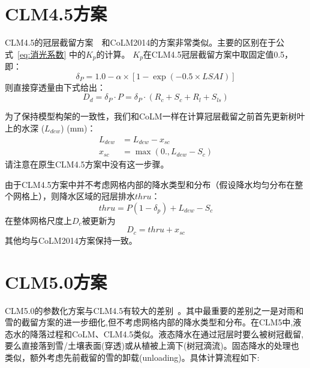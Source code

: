 \section{CLM4.5方案}
CLM4.5的冠层截留方案~\citep{oleson2013technical}~和CoLM2014的方案非常类似。主要的区别在于公式~\eqref{eq:消光系数} 中的$K_p$的计算。
$K_p$在CLM4.5冠层截留方案中取固定值0.5，即：
%
\begin{equation}
\delta_{P}=1.0-\alpha \times\left[1-\exp \left(-0.5 \times LSAI\right)\right]
\end{equation}
则直接穿透量由下式给出：
\begin{equation}
D_{d}=\delta_{P} \cdot P=\delta_{P} \cdot\left(R_{c}+S_{c}+R_{l}+S_{l s}\right)
\end{equation}

为了保持模型构架的一致性，我们和CoLM一样在计算冠层截留之前首先更新树叶上的水深 ($L_{dew}$) (mm)：
\begin{equation}
\begin{aligned}
L_{dew} &= L_{dew}-x_{sc} \\
x_{s c} &= \max \left(0., L_{dew}-S_{c}\right)
\end{aligned}
\end{equation}
请注意在原生CLM4.5方案中没有这一步骤。

由于CLM4.5方案中并不考虑网格内部的降水类型和分布（假设降水均匀分布在整个网格上），则降水区域的冠层排水$thru$：
\begin{equation}
thru=P\left(1-\delta_{p}\right)+L_{dew}-S_{c}
\end{equation}
在整体网格尺度上$D_c$被更新为
\begin{equation}
D_c=thru+x_{s c}
\end{equation}
其他均与CoLM2014方案保持一致。

\section{CLM5.0方案}
CLM5.0的参数化方案与CLM4.5有较大的差别~\citep{lawrence2019community}。其中最重要的差别之一是对雨和雪的截留方案的进一步细化,但不考虑网格内部的降水类型和分布。在CLM5中,液态水的降落过程和CoLM、CLM4.5类似。液态降水在通过冠层时要么被树冠截留,要么直接落到雪/土壤表面(穿透)或从植被上滴下(树冠滴流)。固态降水的处理也类似，额外考虑先前截留的雪的卸载(unloading)。具体计算流程如下:

